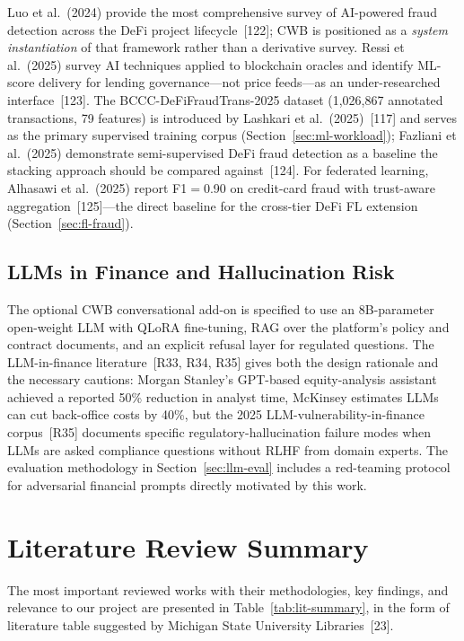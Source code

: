 \documentclass[12pt,a4paper]{report}
\begin{document}
Luo et al.~(2024) provide the most comprehensive survey of AI-powered fraud detection across the DeFi project lifecycle~[122]; CWB is positioned as a \textit{system instantiation} of that framework rather than a derivative survey. Ressi et al.~(2025) survey AI techniques applied to blockchain oracles and identify ML-score delivery for lending governance---not price feeds---as an under-researched interface~[123]. The BCCC-DeFiFraudTrans-2025 dataset (1,026,867 annotated transactions, 79 features) is introduced by Lashkari et al.~(2025)~[117] and serves as the primary supervised training corpus (Section~\ref{sec:ml-workload}); Fazliani et al.~(2025) demonstrate semi-supervised DeFi fraud detection as a baseline the stacking approach should be compared against~[124]. For federated learning, Alhasawi et al.~(2025) report F1$=$0.90 on credit-card fraud with trust-aware aggregation~[125]---the direct baseline for the cross-tier DeFi FL extension (Section~\ref{sec:fl-fraud}).

\subsection{LLMs in Finance and Hallucination Risk}
\label{sec:lit-llm}

The optional CWB conversational add-on is specified to use an 8B-parameter open-weight LLM with QLoRA fine-tuning, RAG over the platform's policy and contract documents, and an explicit refusal layer for regulated questions. The LLM-in-finance literature~[R33, R34, R35] gives both the design rationale and the necessary cautions: Morgan Stanley's GPT-based equity-analysis assistant achieved a reported 50\% reduction in analyst time, McKinsey estimates LLMs can cut back-office costs by 40\%, but the 2025 LLM-vulnerability-in-finance corpus~[R35] documents specific regulatory-hallucination failure modes when LLMs are asked compliance questions without RLHF from domain experts. The evaluation methodology in Section~\ref{sec:llm-eval} includes a red-teaming protocol for adversarial financial prompts directly motivated by this work.

\section{Literature Review Summary}

The most important reviewed works with their methodologies, key findings, and relevance to our project are presented in Table~\ref{tab:lit-summary}, in the form of literature table suggested by Michigan State University Libraries~[23].
\end{document}
